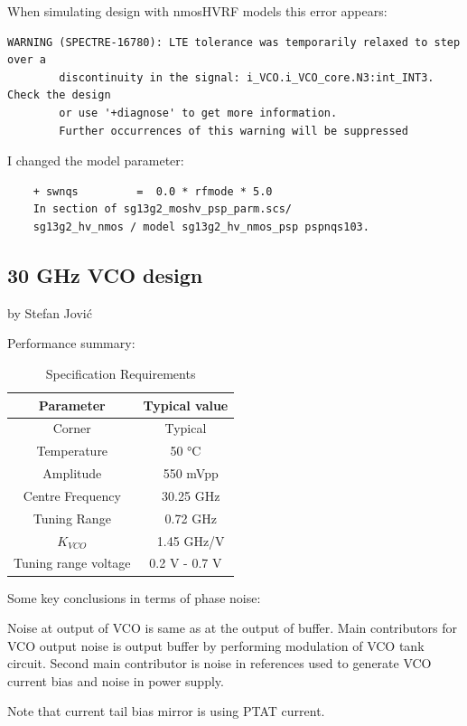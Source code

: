 When simulating design with nmosHVRF models this error appears:

\begin{verbatim}
WARNING (SPECTRE-16780): LTE tolerance was temporarily relaxed to step over a 
		discontinuity in the signal: i_VCO.i_VCO_core.N3:int_INT3. Check the design 
		or use '+diagnose' to get more information.
        Further occurrences of this warning will be suppressed
\end{verbatim}

I changed the model parameter:
\begin{verbatim}
	+ swnqs         =  0.0 * rfmode * 5.0
	In section of sg13g2_moshv_psp_parm.scs/ 
	sg13g2_hv_nmos / model sg13g2_hv_nmos_psp pspnqs103.		
\end{verbatim}

\subsection{30 GHz VCO design}
by Stefan Jović

Performance summary:
\begin{table}[ht]
	\centering
	\begin{tabular}{|c|c|}
		\hline \rowcolor{LightCyan}
		Parameter & Typical value \\
		\hline
		Corner & Typical \\
		\hline
		Temperature & 50 °C \\
		\hline
		Amplitude & ~ 550 mVpp \\
		\hline
		Centre Frequency & ~ 30.25 GHz \\
		\hline
		Tuning Range & ~ 0.72 GHz \\
		\hline
		$K_{VCO}$ & ~ 1.45 GHz/V \\
		\hline
		Tuning range voltage & 0.2 V - 0.7 V \\
		\hline
	\end{tabular}
	\label{30GHz-VCO-design}
	\caption{Specification Requirements} 
\end{table}

Some key conclusions in terms of phase noise:

Noise at output of VCO is same as at the output of buffer. Main contributors for VCO output noise is output buffer by performing modulation of VCO tank circuit. Second main contributor is noise in references used to generate VCO current bias and noise in power supply.

Note that current tail bias mirror is using PTAT current.

